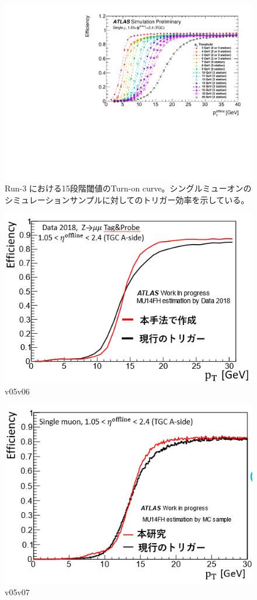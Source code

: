 \begin{figure}[tb]
  \centering
  \includegraphics[clip, width=12cm]{fig/3/PLOT-TRIG-2020-01-fig1.pdf}
  \caption{Run-3 における15段階閾値のTurn-on curve。シングルミューオンのシミュレーションサンプルに対してのトリガー効率を示している。}
  \label{fig:Run3_15_MC5}
\end{figure}

\begin{figure}[tb]
  \centering
  \includegraphics[clip, width=12cm]{fig/4/hikaku_v05_v06.png}
  \caption{v05v06}
  \label{fig:v05v06}
\end{figure}

\begin{figure}[tb]
  \centering
  \includegraphics[clip, width=12cm]{fig/4/hikaku_v05_v07.png}
  \caption{v05v07}
  \label{fig:v05v07}
\end{figure}

